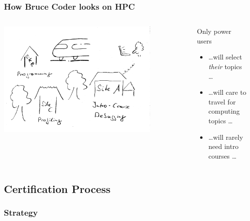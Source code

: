 \begin{frame}
  \frametitle{How Bruce Coder looks on HPC}
  \begin{columns}
   
  \begin{column}{.6\textwidth}
    \centering
  \includegraphics[width=0.8\textwidth]{images/poweruser}
   \end{column}
  

   \begin{column}{.4\textwidth}
    \pause
    Only power users 
    \begin{itemize}[<+->]
     \item \ldots will select \emph{their} topics \ldots
     \item \ldots will care to travel for computing topics \ldots
     \item \ldots will rarely need intro courses \ldots
    
    \end{itemize}

   \end{column}
   \end{columns}
\end{frame}

\subsection{Certification Process}

\begin{frame}
  \frametitle{Strategy}
  
\end{frame}

